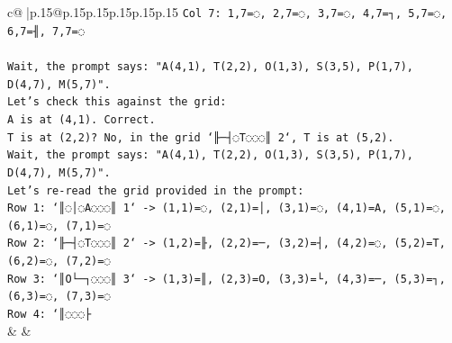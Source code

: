 \documentclass{article}
\begin{document}
{\begin{supertabular}{c@{$\;$}|p{.15\linewidth}@{}p{.15\linewidth}p{.15\linewidth}p{.15\linewidth}p{.15\linewidth}p{.15\linewidth}}
{{{\texttt{Col 7: 1,7=◌, 2,7=◌, 3,7=◌, 4,7=┐, 5,7=◌, 6,7=╢, 7,7=◌} \\
\\ 
\texttt{Wait, the prompt says: "A(4,1), T(2,2), O(1,3), S(3,5), P(1,7), D(4,7), M(5,7)".} \\
\texttt{Let's check this against the grid:} \\
\texttt{A is at (4,1). Correct.} \\
\texttt{T is at (2,2)? No, in the grid `╟─┤◌T◌◌◌║ 2`, T is at (5,2).} \\
\texttt{Wait, the prompt says: "A(4,1), T(2,2), O(1,3), S(3,5), P(1,7), D(4,7), M(5,7)".} \\
\texttt{Let's re{-}read the grid provided in the prompt:} \\
\texttt{Row 1: `║◌│◌A◌◌◌║ 1` {-}> (1,1)=◌, (2,1)=│, (3,1)=◌, (4,1)=A, (5,1)=◌, (6,1)=◌, (7,1)=◌} \\
\texttt{Row 2: `╟─┤◌T◌◌◌║ 2` {-}> (1,2)=╟, (2,2)=─, (3,2)=┤, (4,2)=◌, (5,2)=T, (6,2)=◌, (7,2)=◌} \\
\texttt{Row 3: `║O└─┐◌◌◌║ 3` {-}> (1,3)=║, (2,3)=O, (3,3)=└, (4,3)=─, (5,3)=┐, (6,3)=◌, (7,3)=◌} \\
\texttt{Row 4: `║◌◌◌├} \\
            }
        }
    }
    & & \\ \\


\end{supertabular}}
\end{document}
